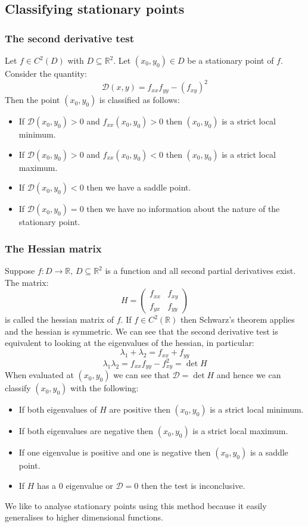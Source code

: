 \documentclass[12pt]{article}
\begin{document}
\subsection*{Classifying stationary points}
\subsubsection*{The second derivative test}
Let \(f\in C^2(D)\) with \(D\subseteq\mathbb{R}^2\). Let \((x_0,y_0)\in D\) be a stationary point of \(f\). Consider the quantity:
\[\mathcal{D}(x,y)=f_{xx}f_{yy}-(f_{xy})^2\]
Then the point \((x_0,y_0)\) is classified as follows:
\begin{itemize}
    \item If \(\mathcal{D}(x_0,y_0) >0\) and \(f_{xx}(x_0,y_0)> 0\) then \((x_0,y_0)\) is a strict local minimum.
    \item If \(\mathcal{D}(x_0,y_0) >0\) and \(f_{xx}(x_0,y_0)< 0\) then \((x_0,y_0)\) is a strict local maximum.
    \item If \(\mathcal{D}(x_0,y_0)<0\) then we have a saddle point.
    \item If \(\mathcal{D}(x_0,y_0)=0\) then we have no information about the nature of the stationary point.
\end{itemize}
\subsubsection*{The Hessian matrix}
Suppose \(f:D\to\mathbb{R},\,D\subseteq\mathbb{R}^2\) is a function and all second partial derivatives exist. The matrix:
\[H=\begin{pmatrix}
    f_{xx} & f_{xy} \\
    f_{yx} & f_{yy}
\end{pmatrix}\]
is called the hessian matrix of \(f\). If \(f\in C^2(\mathbb{R})\) then Schwarz's theorem applies and the hessian is symmetric. We can see that the second derivative test is equivalent to looking at the eigenvalues of the hessian, in particular:
\[\lambda_1+\lambda_2=f_{xx}+f_{yy}\]
\[\lambda_1\lambda_2=f_{xx}f_{yy}-f_{xy}^2=\det H\]
When evaluated at \((x_0,y_0)\) we can see that \(\mathcal{D}=\det H\) and hence we can classify \((x_0,y_0)\) with the following:
\begin{itemize}
    \item If both eigenvalues of \(H\) are positive then \((x_0,y_0)\) is a strict local minimum.
    \item If both eigenvalues are negative then \((x_0,y_0)\) is a strict local maximum.
    \item If one eigenvalue is positive and one is negative then \((x_0,y_0)\) is a saddle point.
    \item If \(H\) has a 0 eigenvalue or \(\mathcal{D}=0\) then the test is inconclusive.
\end{itemize}
We like to analyse stationary points using this method because it easily generalises to higher dimensional functions.
\end{document}
